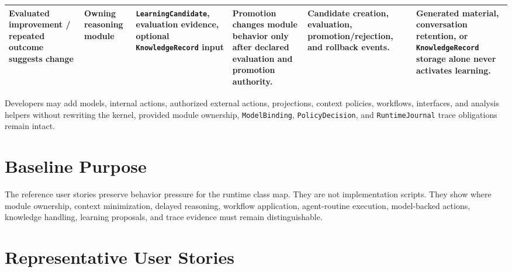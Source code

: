 \documentclass[11pt]{report}
\begin{document}
{\begin{tabularx}{\linewidth}{@{}p{1.8cm}p{2.2cm}p{2.2cm}X X X@{}}
	Evaluated improvement / repeated outcome suggests change & Owning reasoning module & \texttt{LearningCandidate}, evaluation evidence, optional \texttt{KnowledgeRecord} input & Promotion changes module behavior only after declared evaluation and promotion authority. & Candidate creation, evaluation, promotion/rejection, and rollback events. & Generated material, conversation retention, or \texttt{KnowledgeRecord} storage alone never activates learning. \\
	\bottomrule
\end{tabularx}
\normalsize
}\n

Developers may add models, internal actions, authorized external actions, projections, context policies, workflows, interfaces, and analysis helpers without rewriting the kernel, provided module ownership, \texttt{ModelBinding}, \texttt{PolicyDecision}, and \texttt{RuntimeJournal} trace obligations remain intact.


\section{Baseline Purpose}

The reference user stories preserve behavior pressure for the runtime class map. They are not implementation scripts. They show where module ownership, context minimization, delayed reasoning, workflow application, agent-routine execution, model-backed actions, knowledge handling, learning proposals, and trace evidence must remain distinguishable.\n

\section{Representative User Stories}

\end{document}
